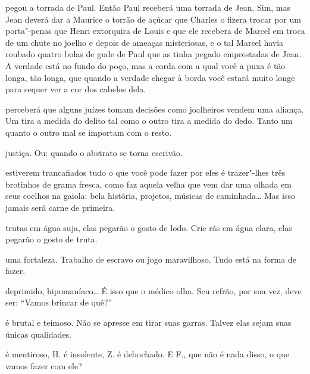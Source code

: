 \pagebreak
\thispagestyle{empty}

\movetooddpage

 pegou a torrada de Paul. Então Paul receberá uma torrada de Jean.
Sim, mas Jean deverá dar a Maurice o torrão de açúcar que Charles o
fizera trocar por um porta"-penas que Henri extorquira de Louis e que ele
recebera de Marcel em troca de um chute no joelho e depois de ameaças
misteriosas, e o tal Marcel havia roubado quatro bolas de gude de Paul
que as tinha pegado emprestadas de Jean. A verdade está no fundo do
poço, mas a corda com a qual você a puxa é tão longa, tão longa, que
quando a verdade chegar à borda você estará muito longe para sequer ver
a cor dos cabelos dela.

\bigskip
\bigskip

 perceberá que alguns juízes tomam decisões como joalheiros vendem
uma aliança. Um tira a medida do delito tal como o outro tira a medida
do dedo. Tanto um quanto o outro mal se importam com o resto.

\bigskip
\bigskip

 justiça. Ou: quando o abstrato se torna escrivão.

\bigskip
\bigskip

 estiverem trancafiados tudo o que você pode fazer por eles é
trazer"-lhes três brotinhos de grama fresca, como faz aquela velha que
vem dar uma olhada em seus coelhos na gaiola: bela história, projetos,
músicas de caminhada\ldots{} Mas isso jamais será carne de primeira.

\bigskip
\bigskip

 trutas em água suja, elas pegarão o gosto de lodo. Crie rãs em água
clara, elas pegarão o gosto de truta.

\bigskip
\bigskip

 uma fortaleza. Trabalho de escravo ou jogo maravilhoso. Tudo
está na forma de fazer.

\bigskip
\bigskip

 deprimido, hipomaníaco\ldots{} É isso que o médico olha. Seu
refrão, por sua vez, deve ser: ``Vamos brincar de quê?''

\bigskip
\bigskip

 é brutal e teimoso. Não se apresse em tirar suas garras. Talvez elas
sejam suas únicas qualidades.

\bigskip
\bigskip

 é mentiroso, H. é insolente, Z. é debochado. E F., que não é nada
disso, o que vamos fazer com ele?

